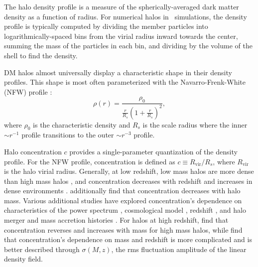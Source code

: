 The halo density profile is a measure of the spherically-averaged dark matter density as a function of radius.  For numerical halos in \nbody\ simulations, the density profile is typically computed by dividing the member particles into logarithmically-spaced bins from the virial radius inward towards the center, summing the mass of the particles in each bin, and dividing by the volume of the shell to find the density.

DM halos almost universally display a characteristic shape in their density profiles.  This shape is most often parameterized with the Navarro-Frenk-White (NFW) profile \citep{1996ApJ...462..563N}:
\begin{equation} \label{eq:nfw_profile}
	\rho(r) = \frac{ \rho_{0} }{ \frac{ r }{ R_{s}} \left( 1 + \frac{r}{R_{s}} \right)^{2} },
\end{equation}
where $\rho_{0}$ is the characteristic density and $R_{s}$ is the scale radius where the inner $\sim r^{-1}$ profile transitions to the outer $\sim r^{-3}$ profile.


Halo concentration $c$ provides a single-parameter quantization of the density profile.  For the NFW profile, concentration is defined as $c \equiv R_{\mathrm{vir}} / R_{s}$, where $R_{\mathrm{vir}}$ is the halo virial radius.  Generally, at low redshift, low mass halos are more dense than high mass halos \citep{1997ApJ...490..493N}, and concentration decreases with redshift and increases in dense environments \citep{2001MNRAS.321..559B}.  \citet{2007MNRAS.381.1450N} additionally find that concentration decreases with halo mass.  Various additional studies have explored concentration's dependence on characteristics of the power spectrum \citep{2001ApJ...554..114E}, cosmological model \citep{2008MNRAS.391.1940M}, redshift \citep{2008MNRAS.387..536G, 2011MNRAS.411..584M}, and halo merger and mass accretion histories \citep{2002ApJ...568...52W, 2003MNRAS.339...12Z, 2009ApJ...707..354Z}.  For halos at high redshift, \citet{2011ApJ...740..102K} find that concentration reverses and increases with mass for high mass halos, while \citet{2012MNRAS.423.3018P} find that concentration's dependence on mass and redshift is more complicated and is better described through $\sigma(M,z)$, the rms fluctuation amplitude of the linear density field.

